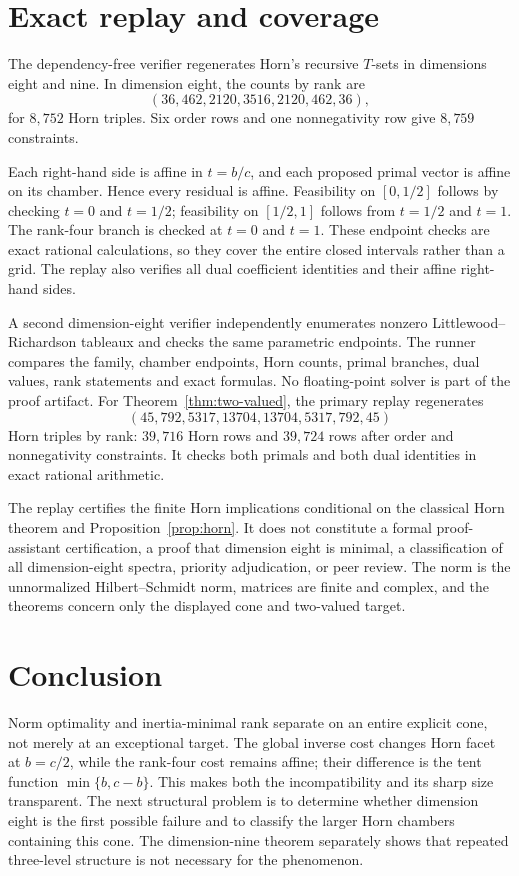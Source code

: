 \documentclass[11pt]{article}
\begin{document}
\section{Exact replay and coverage}\label{sec:replay}

The dependency-free verifier regenerates Horn's recursive $T$-sets in
dimensions eight and nine.  In dimension eight, the counts by rank are
\[
 (36,462,2120,3516,2120,462,36),
\]
for $8{,}752$ Horn triples.  Six order rows and one nonnegativity row give
$8{,}759$ constraints.

Each right-hand side is affine in $t=b/c$, and each proposed primal vector is
affine on its chamber.  Hence every residual is affine.  Feasibility on
$[0,1/2]$ follows by checking $t=0$ and $t=1/2$; feasibility on $[1/2,1]$
follows from $t=1/2$ and $t=1$.  The rank-four branch is checked at $t=0$ and
$t=1$.  These endpoint checks are exact rational calculations, so they cover
the entire closed intervals rather than a grid.  The replay also verifies all
dual coefficient identities and their affine right-hand sides.

A second dimension-eight verifier independently enumerates nonzero
Littlewood--Richardson tableaux and checks the same parametric endpoints.  The
runner compares the family, chamber endpoints, Horn counts, primal branches,
dual values, rank statements and exact formulas.  No floating-point solver is
part of the proof artifact.  For Theorem~\ref{thm:two-valued}, the primary
replay regenerates
\[
 (45,792,5317,13704,13704,5317,792,45)
\]
Horn triples by rank: $39{,}716$ Horn rows and $39{,}724$ rows after order and
nonnegativity constraints.  It checks both primals and both dual identities in
exact rational arithmetic.

The replay certifies the finite Horn implications conditional on the classical
Horn theorem and Proposition~\ref{prop:horn}.  It does not constitute a formal
proof-assistant certification, a proof that dimension eight is minimal, a
classification of all dimension-eight spectra, priority adjudication, or peer
review.  The norm is the unnormalized Hilbert--Schmidt norm, matrices are
finite and complex, and the theorems concern only the displayed cone and
two-valued target.

\section{Conclusion}

Norm optimality and inertia-minimal rank separate on an entire explicit cone,
not merely at an exceptional target.  The global inverse cost changes Horn
facet at $b=c/2$, while the rank-four cost remains affine; their difference is
the tent function $\min\{b,c-b\}$.  This makes both the incompatibility and its
sharp size transparent.  The next structural problem is to determine whether
dimension eight is the first possible failure and to classify the larger Horn
chambers containing this cone.  The dimension-nine theorem separately shows
that repeated three-level structure is not necessary for the phenomenon.
\end{document}
